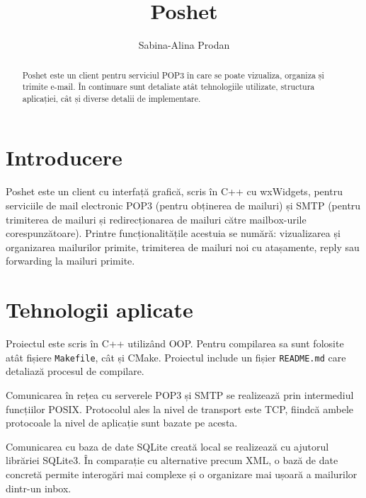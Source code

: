 \documentclass[runningheads]{llncs}
\begin{document}
%
\title{Poshet}
%
%
\author{Sabina-Alina Prodan}
%
%
%
\maketitle              %
%
\begin{abstract}
Poshet este un client pentru serviciul POP3 în care se poate vizualiza, organiza și trimite e-mail. În continuare sunt detaliate atât tehnologiile utilizate, structura aplicației, cât și diverse detalii de implementare.

\end{abstract}
%
%
%
\section{Introducere}

Poshet este un client cu interfață grafică, scris în C++ cu wxWidgets, pentru serviciile de mail electronic POP3 (pentru obținerea de mailuri) și SMTP (pentru trimiterea de mailuri și redirecționarea de mailuri către mailbox-urile corespunzătoare). Printre funcționalitățile acestuia se numără: vizualizarea și organizarea mailurilor primite, trimiterea de mailuri noi cu atașamente, reply sau forwarding la mailuri primite.

\section{Tehnologii aplicate}

Proiectul este scris în C++ utilizând OOP. Pentru compilarea sa sunt folosite atât fișiere \texttt{Makefile}, cât și CMake. Proiectul include un fișier \texttt{README.md} care detaliază procesul de compilare.

Comunicarea în rețea cu serverele POP3 și SMTP se realizează prin intermediul funcțiilor POSIX. Protocolul ales la nivel de transport este TCP, fiindcă ambele protocoale la nivel de aplicație sunt bazate pe acesta.

Comunicarea cu baza de date SQLite creată local se realizează cu ajutorul librăriei SQLite3. În comparație cu alternative precum XML, o bază de date concretă permite interogări mai complexe și o organizare mai ușoară a mailurilor dintr-un inbox.
\end{document}

